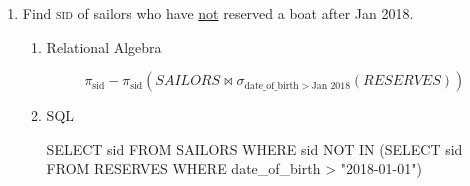 \begin{enumerate}
          \begin{enumerate}
              \item Relational Algebra
                    \begin{multline*}
                        \pi_{sname}(SAILORS \bowtie RESERVES \bowtie (\sigma_{\text{color} = red}(BOATS))) \; \cap  \\
                        \pi_{sname}(SAILORS \bowtie RESERVES \bowtie (\sigma_{\text{color} = green}(BOATS)))
                    \end{multline*}

              \item SQL
                    \begin{sqlQuery}{DSY_cod_example3}
                    SELECT DISTINCT S1.sname
                    FROM SAILORS S1, RESERVES R1, BOATS B1,
                    RESERVES R2, BOATS B2
                    WHERE S1.sid = R1.sid 
                        AND R1.bid = B1.bid
                        AND S1.sid = R2.sid 
                        AND R2.bid = B2.bid
                        AND B1.color = "red" 
                        AND B2.color = "green";
                \end{sqlQuery}
          \end{enumerate}

    \item Find \textsc{sid} of sailors who have \underline{not} reserved a boat after Jan 2018.

          \begin{enumerate}
              \item Relational Algebra

                    \begin{equation*}
                        \pi_{\text{sid}} - \pi_{\text{sid}}(SAILORS \bowtie \sigma_{\text{date\_of\_birth}\; >\; \text{Jan 2018}}(RESERVES))
                    \end{equation*}

              \item SQL
                    \begin{sqlQuery}{}
                    SELECT sid FROM SAILORS 
                    WHERE sid NOT IN 
                        (SELECT sid FROM RESERVES 
                        WHERE date_of_birth > "2018-01-01")
                    \end{sqlQuery}

          \end{enumerate}


\end{enumerate}
